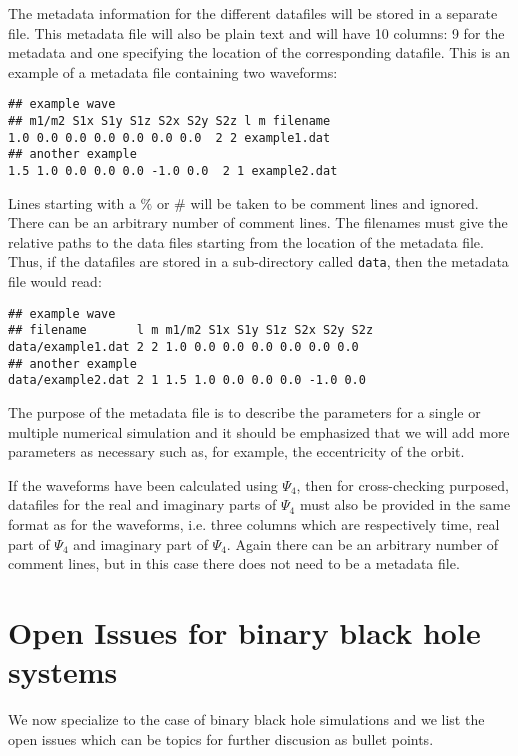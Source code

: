 \documentclass{article}
\numberwithin{equation}{section}
\begin{document}
The metadata information for the different datafiles will be stored in
a separate file.  This metadata file will also be plain text and
will have 10 columns: 9 for the metadata and one specifying
the location of the corresponding datafile.  This is an example of a
metadata file containing two waveforms:
\begin{verbatim}
## example wave
## m1/m2 S1x S1y S1z S2x S2y S2z l m filename
1.0 0.0 0.0 0.0 0.0 0.0 0.0  2 2 example1.dat
## another example
1.5 1.0 0.0 0.0 0.0 -1.0 0.0  2 1 example2.dat
\end{verbatim}
Lines starting with a $\%$ or $\#$ will be taken to be comment lines and
ignored.  There can be an arbitrary number of comment lines.  The
filenames must give the relative paths to the data files starting from
the location of the metadata file.  Thus, if the datafiles are stored
in a sub-directory called \texttt{data}, then the metadata file would read:
\begin{verbatim}
## example wave
## filename       l m m1/m2 S1x S1y S1z S2x S2y S2z 
data/example1.dat 2 2 1.0 0.0 0.0 0.0 0.0 0.0 0.0
## another example
data/example2.dat 2 1 1.5 1.0 0.0 0.0 0.0 -1.0 0.0
\end{verbatim}
The purpose of the metadata file is to describe the parameters for a
single or multiple numerical simulation and it should be emphasized
that we will add more parameters as necessary such as, for example, the
eccentricity of the orbit.  

If the waveforms have been calculated using $\Psi_4$, then for
cross-checking purposed, datafiles for the real and imaginary parts of
$\Psi_4$ must also be provided in the same format as for the
waveforms, i.e. three columns which are respectively time, real part
of $\Psi_4$ and imaginary part of $\Psi_4$.  Again there can be an
arbitrary number of comment lines, but in this case there does not
need to be a metadata file.


\section{Open Issues for binary black hole systems}

We now specialize to the case of binary black hole simulations and we
list the open issues which can be topics for further discusion as
bullet points.  
\end{document}
